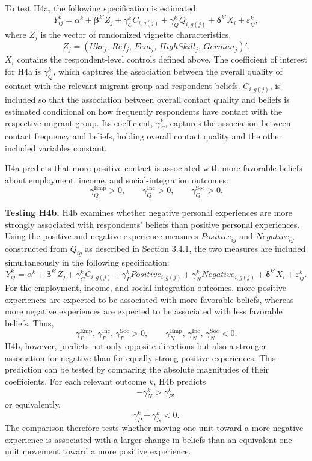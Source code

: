 To test H4a, the following specification is estimated:
\begin{equation}
Y_{ij}^{k}
=
\alpha^{k}
+ \boldsymbol{\beta}^{k\prime} Z_j
+ \gamma_{C}^{k} C_{i,g(j)}
+ \gamma_{Q}^{k} Q_{i,g(j)}
+ \boldsymbol{\delta}^{k\prime} X_i
+ \varepsilon_{ij}^{k},
\end{equation}
where \(Z_j\) is the vector of randomized vignette characteristics,
\[
Z_j =
\left(
Ukr_j,\,
Ref_j,\,
Fem_j,\,
HighSkill_j,\,
German_j
\right)'.
\]
\(X_i\) contains the respondent-level controls defined above. The coefficient of interest for H4a is \(\gamma_Q^k\), 
which captures the association between the overall quality of contact with the relevant migrant group and respondent 
beliefs. \(C_{i,g(j)}\), is included so that the association between overall contact quality and beliefs is estimated 
conditional on how frequently respondents have contact with the respective migrant group. Its coefficient, 
\(\gamma_C^k\), captures the association between contact frequency and beliefs, holding overall contact quality
and the other included variables constant.

H4a predicts that more positive contact is associated with more favorable beliefs about employment, income, and 
social-integration outcomes:
\[
\gamma_Q^{\mathrm{Emp}}>0,\qquad
\gamma_Q^{\mathrm{Inc}}>0,\qquad
\gamma_Q^{\mathrm{Soc}}>0.
\]

\noindent\textbf{Testing H4b.} H4b examines whether negative personal experiences are more strongly associated with 
respondents' beliefs than positive personal experiences. Using the positive and negative experience measures 
\(Positive_{ig}\) and \(Negative_{ig}\) constructed from \(Q_{ig}\) as described in Section 3.4.1, the two measures are 
included simultaneously in the following specification:
\begin{equation}
Y_{ij}^{k}
=
\alpha^{k}
+ \boldsymbol{\beta}^{k\prime}Z_j
+ \gamma_C^{k}C_{i,g(j)}
+ \gamma_P^{k}Positive_{i,g(j)}
+ \gamma_N^{k}Negative_{i,g(j)}
+ \boldsymbol{\delta}^{k\prime}X_i
+ \varepsilon_{ij}^{k}.
\end{equation}
For the employment, income, and social-integration outcomes, more positive experiences are expected to be associated 
with more favorable beliefs, whereas more negative experiences are expected to be associated with less favorable beliefs. 
Thus,
\[
\gamma_P^{\mathrm{Emp}},\,
\gamma_P^{\mathrm{Inc}},\,
\gamma_P^{\mathrm{Soc}}>0,
\qquad
\gamma_N^{\mathrm{Emp}},\,
\gamma_N^{\mathrm{Inc}},\,
\gamma_N^{\mathrm{Soc}}<0.
\]
H4b, however, predicts not only opposite directions but also a stronger association for negative than for equally 
strong positive experiences. This prediction can be tested by comparing the absolute magnitudes of their coefficients. 
For each relevant outcome \(k\), H4b predicts
\[
-\gamma_N^{k}>\gamma_P^{k},
\]
or equivalently,
\[
\gamma_P^{k}+\gamma_N^{k}<0.
\]
The comparison therefore tests whether moving one unit toward a more negative experience is associated with a larger 
change in beliefs than an equivalent one-unit movement toward a more positive experience.

